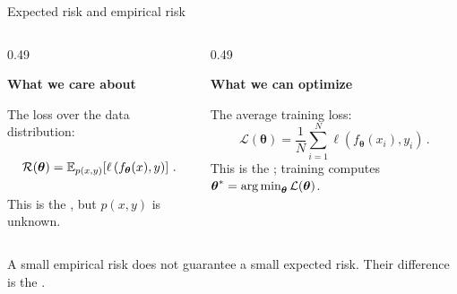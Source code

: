 \begin{frame}{Expected risk and empirical risk}

	\small
	\begin{columns}[T,onlytextwidth]
		\begin{column}{0.49\textwidth}
			\begin{tcolorbox}[nndsgreen,courseheight={linear-risk}{0.61\textheight}]
				\textbf{\color{darkgreen}What we care about}

				The loss over the data distribution:
				\begin{equation}
					\vphantom{\sum_{i=1}^{N}}%
					\mathcal{R}(\boldsymbol{\theta})
					=\mathbb{E}_{p(x,y)}\!\left[
						\ell\left(f_{\boldsymbol{\theta}}(x),y\right)\right] \,.
				\end{equation}
				This is the , but $p(x,y)$ is unknown.
			\end{tcolorbox}
		\end{column}
		\begin{column}{0.49\textwidth}
			\begin{tcolorbox}[nndsblue,courseheight={linear-risk}{0.61\textheight}]
				\textbf{\color{darkcerulean}What we can optimize}

				The average training loss:
				\begin{equation}
					\mathcal{L}(\boldsymbol{\theta})
					=\frac{1}{N}\sum_{i=1}^{N}
					\ell\left(f_{\boldsymbol{\theta}}(x_i),y_i\right) \,.
				\end{equation}
				This is the ; training computes $\boldsymbol{\theta}^*=\operatorname*{arg\,min}_{\boldsymbol{\theta}}\mathcal{L}(\boldsymbol{\theta})$.
			\end{tcolorbox}
		\end{column}
	\end{columns}

	\begin{tcolorbox}[nndsorange,boxsep=1mm,top=1mm,bottom=1mm]
		A small empirical risk does not guarantee a small expected risk. Their difference is the .
	\end{tcolorbox}

\end{frame}

